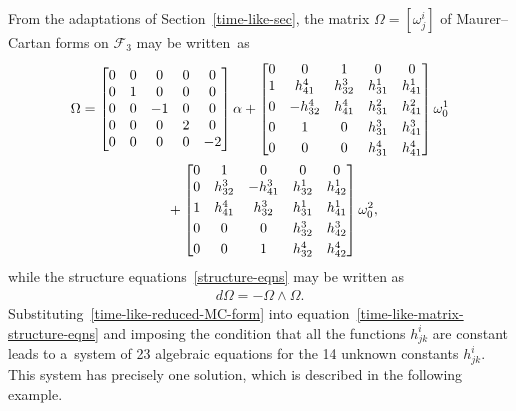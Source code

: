 \documentclass[pdftex]{sigma}
\numberwithin{equation}{section}
\theoremstyle{definition}
\begin{document}
From the adaptations of Section~\ref{time-like-sec}, the matrix $\Omega = [\omega^i_j]$ of Maurer--Cartan forms on
$\mathcal{F}_3$ may be written~as
\begin{gather}
\Omega =
\begin{bmatrix}
0 & 0 & 0 & 0 & 0
\\
0 & 1 & 0 & 0 & 0
\\
0 & 0 & -1 & 0 & 0
\\
0 & 0 & 0 & 2 & 0
\\
0 & 0 & 0 & 0 & -2
\end{bmatrix}
\alpha +
\begin{bmatrix}
0 & 0 & 1 & 0 & 0
\\
1 & h^4_{41} & h^3_{32} & h^1_{31} & h^1_{41}
\vspace{1mm}\\
0 & -h^4_{32} & h^4_{41} & h^2_{31} & h^2_{41}
\vspace{1mm}\\
0 & 1 & 0 & h^3_{31} & h^3_{41}
\vspace{1mm}\\
0 & 0 & 0 & h^4_{31} & h^4_{41}
\end{bmatrix}
\omega^1_0 \nonumber\\
\hphantom{\Omega =}{}
+
\begin{bmatrix}
0 & 1 & 0 & 0 & 0
\\
0 & h^3_{32} & -h^3_{41} & h^1_{32} & h^1_{42}
\vspace{1mm}\\
1 & h^4_{41} & h^3_{32} & h^1_{31} & h^1_{41}
\vspace{1mm}\\
0 & 0 & 0 & h^3_{32} & h^3_{42}
\vspace{1mm}\\
0 & 0 & 1 & h^4_{32} & h^4_{42}
\end{bmatrix}
\omega^2_0,
\label{time-like-reduced-MC-form}
\end{gather}
while the structure equations~\eqref{structure-eqns} may be written as
\begin{gather}
d\Omega = - \Omega \wedge \Omega.
\label{time-like-matrix-structure-eqns}
\end{gather}
Substituting~\eqref{time-like-reduced-MC-form} into equation~\eqref{time-like-matrix-structure-eqns} and imposing the
condition that all the functions $h^i_{jk}$ are constant leads to a~system of 23 algebraic equations for the 14 unknown
constants $h^i_{jk}$.
This system has precisely one solution, which is described in the following example.
\end{document}
